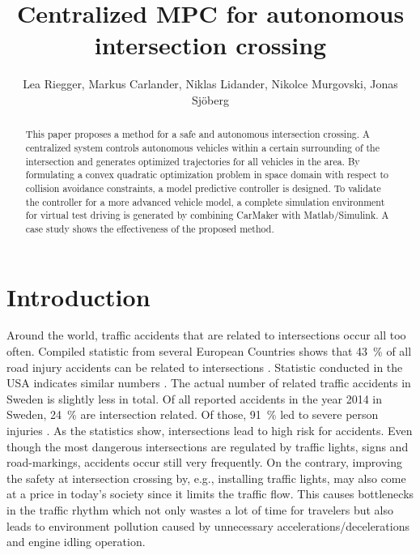 \documentclass[letterpaper,10pt,conference]{ieeeconf}
\author{Lea Riegger, Markus Carlander, Niklas Lidander, Nikolce Murgovski, Jonas Sj\"oberg}
\begin{document}
\title{Centralized MPC for autonomous intersection crossing}

\maketitle
\thispagestyle{empty}
\pagestyle{empty}

\begin{abstract}
This paper proposes a method for a safe and autonomous intersection crossing. A centralized system controls autonomous vehicles within a certain surrounding of the intersection and generates optimized trajectories for all vehicles in the area. By formulating a convex quadratic optimization problem in space domain with respect to collision avoidance constraints, a model predictive controller is designed. To validate the controller for a more advanced vehicle model, a complete simulation environment for virtual test driving is generated by combining CarMaker with Matlab/Simulink. A case study shows the effectiveness of the proposed method.
\end{abstract}

\IEEEpeerreviewmaketitle

\section{Introduction}%

Around the world, traffic accidents that are related to intersections occur all too often. Compiled statistic from several European Countries shows that \SI{43}{\%} of all road injury accidents can be related to intersections \cite{molinero}. Statistic conducted in the USA indicates similar numbers \cite{nhtsa}. The actual number of related traffic accidents in Sweden is slightly less in total. Of all reported accidents in the year 2014 in Sweden, \SI{24}{\%} are intersection related. Of those, \SI{91}{\%} led to severe person injuries \cite{sverige}. As the statistics show, intersections lead to high risk for accidents. Even though the most dangerous intersections are regulated by traffic lights, signs and road-markings, accidents occur still very frequently. On the contrary, improving the safety at intersection crossing by, e.g., installing traffic lights, may also come at a price in today's society since it limits the traffic flow. This causes bottlenecks in the traffic rhythm which not only wastes a lot of time for travelers but also leads to environment pollution caused by unnecessary accelerations/decelerations and engine idling operation.
\end{document}
